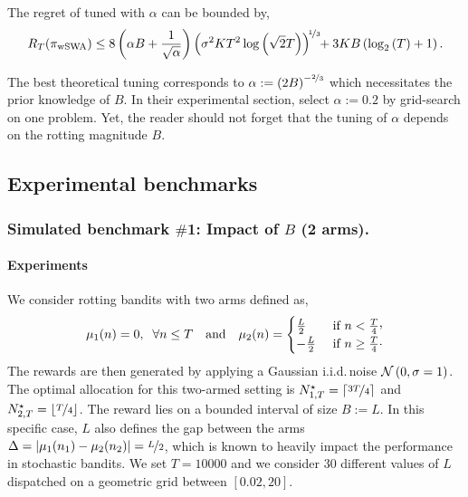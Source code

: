 \begin{corollary}
\label{cor:wSWA}
The regret of \wSWA tuned with $\alpha$ can be bounded by,
\[
R_T(\pi_{\rm wSWA}) \leq 8 \left(\alpha B + \frac{1}{\sqrt{\alpha} }\right) \left( \sigma^2 K T^2 \log\left(\sqrt{2}T\right)\right)^{\!\nicefrac{1}{3}\!} \!+ 3KB\left(\log_2\left(T\right) +1\right) . 
\]
\end{corollary}

The best theoretical tuning corresponds to $\alpha := \left(2B\right)^{-\nicefrac{2}{3}}$ which necessitates the prior knowledge of $B$. In their experimental section, \citet{levine2017rotting} select $\alpha:= 0.2$ by grid-search on one problem. Yet, the reader should not forget that the tuning of $\alpha$ depends on the rotting magnitude $B$.

\subsection{Experimental benchmarks}
\label{subsec:rested-experiment1}
\subsubsection{Simulated benchmark $\#$1: Impact of $B$ (2 arms).}

\paragraph{Experiments} We consider rotting bandits with two arms defined as,
%
\begin{align*}
\reward_1(n) = 0, \;\; \forall n \leq \timeEnd \quad \text{and}  \quad
\reward_2(n) = \begin{cases}
\frac{\lipschitz}{2}  & \text{ if } n < \frac{\timeEnd}{4}\CommaBin \\
-\frac{\lipschitz}{2} & \text{ if } n \geq \frac{\timeEnd}{4}\cdot
\end{cases}
\end{align*}
%
The rewards are then generated by applying a Gaussian i.i.d.\,noise $\mathcal{N}\left(0,\sigma = 1\right)$. The optimal allocation for this two-armed setting is $N_{1,T}^\star = \left\lceil\nicefrac{3T}{4}\right\rceil$ and $N_{2,T}^\star=\left\lfloor\nicefrac{T}{4}\right\rfloor$. The reward lies on a bounded interval of size $B := L$. In this specific case, $L$ also defines the gap between the arms $\Delta = |\mu_1(n_1) - \mu_2(n_2)| = \nicefrac{L}{2}$, which is known to heavily impact the performance in stochastic bandits. We set $T=10 000$ and we consider 30 different values of $L$ dispatched on a geometric grid between $\left[0.02, 20\right]$.

